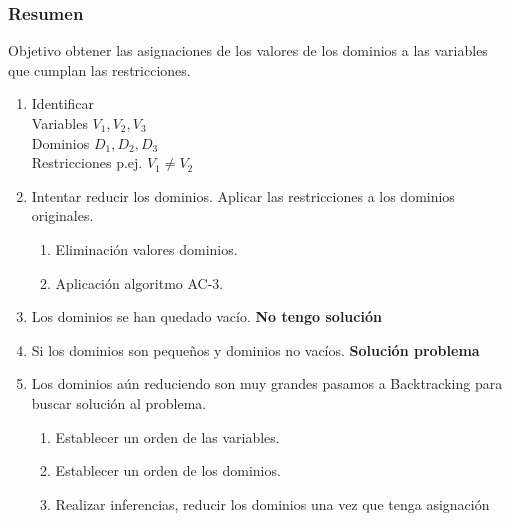 \documentclass{beamer}
\begin{document}
\begin{frame}  \frametitle{Resumen} \scriptsize

Objetivo obtener las asignaciones de los valores de los dominios a las variables que cumplan las restricciones. 


\begin{enumerate}
\item  Identificar \\
Variables 			$V_1, V_2, V_3$\\
Dominios 		$D_1, D_2, D_3$\\
Restricciones	p.ej.  $V_1 \neq V_2$\\

\item  Intentar reducir los dominios. Aplicar las restricciones a los dominios originales.
\begin{enumerate} \scriptsize
\item Eliminación valores dominios.
\item  Aplicación algoritmo AC-3. 
\end{enumerate}

\item  Los dominios se han quedado vacío.  \textbf{No tengo solución } 
\item  Si los dominios son pequeños y dominios no vacíos.  \textbf{Solución problema}

\item Los dominios aún reduciendo son muy grandes pasamos a Backtracking para buscar solución al problema. 
\begin{enumerate} \scriptsize
\item 	Establecer un orden de las variables.
\item 	Establecer un orden de los dominios.
\item 	 Realizar inferencias, reducir los dominios una vez que tenga asignación
\end{enumerate}

\end{enumerate}



\end{frame} 
%
%
%
\end{document}
